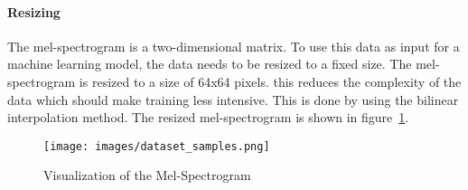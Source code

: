 \paragraph{Resizing}
The mel-spectrogram is a two-dimensional matrix. To use this data as input for a machine learning model, the data needs to be resized to a fixed size. The mel-spectrogram is resized to a size of 64x64 pixels. this reduces the complexity of the data which should make training less intensive. This is done by using the bilinear interpolation method. The resized mel-spectrogram is shown in figure~\ref{fig:resized-mel-spectrogram}.

\begin{figure}[h] %
    \centering %
    \texttt{[image: images/dataset\_samples.png]}
    \caption{Visualization of the Mel-Spectrogram} %
    \label{fig:resized-mel-spectrogram} %
\end{figure}




